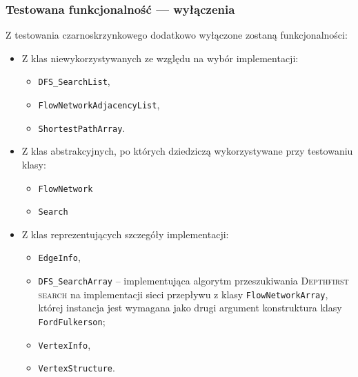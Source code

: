 \subsubsection{Testowana funkcjonalność --- wyłączenia}
Z testowania czarno\dywiz skrzynkowego dodatkowo wyłączone zostaną funkcjonalności:
\begin{itemize}
    \item Z klas niewykorzystywanych ze względu na wybór implementacji:
        \begin{itemize}
            \item \texttt{DFS\_SearchList},
            \item \texttt{FlowNetworkAdjacencyList},
            \item \texttt{ShortestPathArray}.
        \end{itemize}
    \item Z klas abstrakcyjnych, po których dziedziczą wykorzystywane przy testowaniu klasy:
        \begin{itemize}
            \item \texttt{FlowNetwork}
            \item \texttt{Search}
        \end{itemize}
    \item Z klas reprezentujących szczegóły implementacji:
        \begin{itemize}
            \item \texttt{EdgeInfo},
            \item \texttt{DFS\_SearchArray} -- implementująca algorytm
                przeszukiwania \textsc{Depth\dywiz first search} na
                implementacji sieci przepływu z klasy \texttt{FlowNetworkArray},
                której instancja jest wymagana jako drugi argument konstruktura
                klasy \texttt{FordFulkerson};
            \item \texttt{VertexInfo},
            \item \texttt{VertexStructure}.
        \end{itemize}
\end{itemize}


